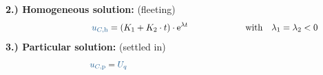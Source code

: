 \begin{frame}[t]
\begin{align*}
\end{align*}%
\pause%
\textbf{2.) Homogeneous solution:} (fleeting)
\begin{align}
    &&
        \ecv{u_{C,\mathrm{h}}} &= \left( K_1 + K_2 \cdot t \right) \cdot \mathrm{e}^{\lambda t}
    &&\text{with}\quad \lambda_1 = \lambda_2 < 0  \label{eq:dgl:rlc:homolsg:grenzfall}
    \\[-15pt] &\hphantom{1rrrrrrrrrrrrrrrr} &   \hphantom{2llllll}&\hphantom{\mathrel{\phantom{=}}2rrrrrrrrrrrrrrrrrrrrrrrrrrr}     &&\hphantom{3rrrrrrrrrrrrrrrrrrrrrrrr} \nonumber
\end{align}%
\textbf{3.) Particular solution:} (settled in)%
\begin{align*}
    &&
        \ecv{u_{C,\mathrm{p}}} &= \ecv{U_q}
    \\[-15pt] &\hphantom{1rrrrrrrrrrrrrrrr} &   \hphantom{2llllll}&\hphantom{\mathrel{\phantom{=}}2rrrrrrrrrrrrrrrrrrrrrrrrrrr}     &&\hphantom{3rrrrrrrrrrrrrrrrrrrrrrrr} \nonumber
    \end{align*}
\end{frame}


